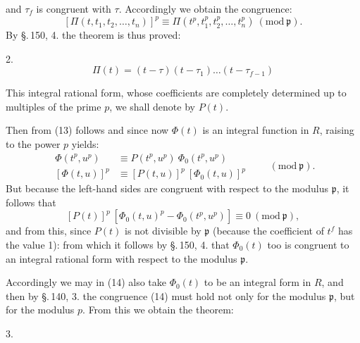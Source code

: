 and $\tau_f$ is congruent with $\tau$. Accordingly we obtain the
congruence:
\[
[\Pi(t, t_1, t_2, \ldots, t_n)]^p \equiv \Pi(t^p, t_1^p, t_2^p, \ldots, t_n^p)\ (\mathrm{mod}\ \mathfrak p).
\]
By \S.\,150, 4. the theorem is thus proved:

2. 
\[
\Pi(t) = (t - \tau)(t - \tau_1) \ldots (t - \tau_{f-1})
\]

This integral rational form, whose coefficients are completely
determined up to multiples of the prime $p$, we shall denote by $P(t)$.

Then from (13) follows
and since now $\Phi(t)$ is an integral function in $R$, raising to the
power $p$ yields:
\[
\begin{aligned}
\Phi(t^p, u^p) &\equiv P(t^p, u^p)\ \Phi_0(t^p, u^p) \\
[\Phi(t, u)]^p &\equiv [P(t, u)]^p\ [\Phi_0(t, u)]^p
\end{aligned}
\qquad (\mathrm{mod}\ \mathfrak p).
\]
But because the left-hand sides are congruent with respect to the
modulus $\mathfrak p$, it follows that
\[
[P(t)]^p\ [\Phi_0(t, u)^p - \Phi_0(t^p, u^p)] \equiv 0\ (\mathrm{mod}\ \mathfrak p),
\]
and from this, since $P(t)$ is not divisible by $\mathfrak p$ (because
the coefficient of $t^f$ has the value 1):
from which it follows by \S.\,150, 4. that $\Phi_0(t)$ too is
congruent to an integral rational form with respect to the modulus
$\mathfrak p$.

Accordingly we may in (14) also take $\Phi_0(t)$ to be an integral
form in $R$, and then by \S.\,140, 3. the congruence (14) must hold
not only for the modulus $\mathfrak p$, but for the modulus $p$.
From this we obtain the theorem:

3. 
